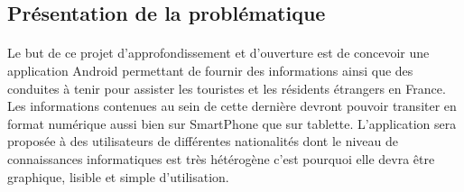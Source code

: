 \subsection{Présentation de la problématique}

	\paragraph{}
		Le but de ce projet d'approfondissement et d'ouverture est de concevoir une application Android permettant de fournir des informations ainsi que des conduites à tenir pour assister les touristes et les résidents étrangers en France. Les informations contenues au sein de cette dernière devront pouvoir transiter en format numérique aussi bien sur SmartPhone que sur tablette. L'application sera proposée à des utilisateurs de différentes nationalités dont le niveau de connaissances informatiques est très hétérogène c'est pourquoi elle devra être graphique, lisible et simple d'utilisation.